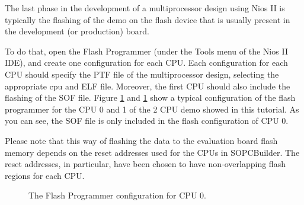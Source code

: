 The last phase in the development of a multiprocessor design using
Nios II is typically the flashing of the demo on the flash device that
is usually present in the development (or production) board.

To do that, open the Flash Programmer (under the Tools menu of the
Nios II IDE), and create one configuration for each CPU. Each
configuration for each CPU should specify the PTF file of the
multiprocessor design, selecting the appropriate cpu and ELF
file. Moreover, the first CPU should also include the flashing of the
SOF file. Figure \ref{fig:tutorial-flash-programmer-cpu0} and
\ref{fig:tutorial-flash-programmer-cpu0} show a typical configuration
of the flash programmer for the CPU 0 and 1 of the 2 CPU demo showed
in this tutorial. As you can see, the SOF file is only included in the
flash configuration of CPU 0.

Please note that this way of flashing the data to the evaluation board
flash memory depends on the reset addresses used for the CPUs in
SOPCBuilder. The reset addresses, in particular, have been chosen to
have non-overlapping flash regions for each CPU.

%
\begin{figure}


\caption{\label{fig:tutorial-flash-programmer-cpu0}The Flash
Programmer configuration for CPU 0.}
\end{figure}

